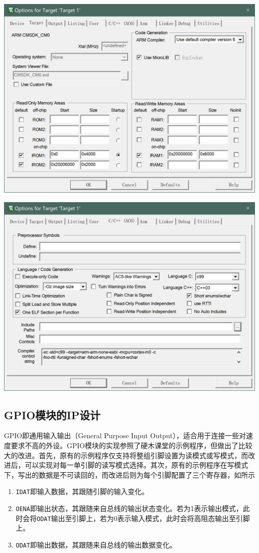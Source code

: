 \begin{Figure}[Keil中的相关配置]
    \begin{FigureSub}[内存配置]
        \includegraphics[width=0.4\linewidth]{image/1.png}
    \end{FigureSub}
    \hspace{0.1\linewidth}
    \begin{FigureSub}[编译优化]
        \includegraphics[width=0.4\linewidth]{image/2.png}
    \end{FigureSub}
\end{Figure}

\subsection{GPIO模块的IP设计}
GPIO即通用输入输出（General Purpose Input Output），适合用于连接一些对速度要求不高的外设。GPIO模块的实现参照了硬木课堂的示例程序，但做出了比较大的改进。首先，原有的示例程序仅支持将整组引脚设置为读模式或写模式，而改进后，可以实现对每一单引脚的读写模式选择。其次，原有的示例程序在写模式下，写出的数据是不可读回的，而改进后则为每个引脚配置了三个寄存器，如所示
\begin{enumerate}
    \item \texttt{IDAT}即输入数据，其跟随引脚的输入变化。
    \item \texttt{OENA}即输出状态，其跟随来自总线的输出状态变化。若为1表示输出模式，此时会将\texttt{ODAT}输出至引脚上，若为0表示输入模式，此时会将高阻态输出至引脚上。
    \item \texttt{ODAT}即输出数据，其跟随来自总线的输出数据变化。
\end{enumerate}

